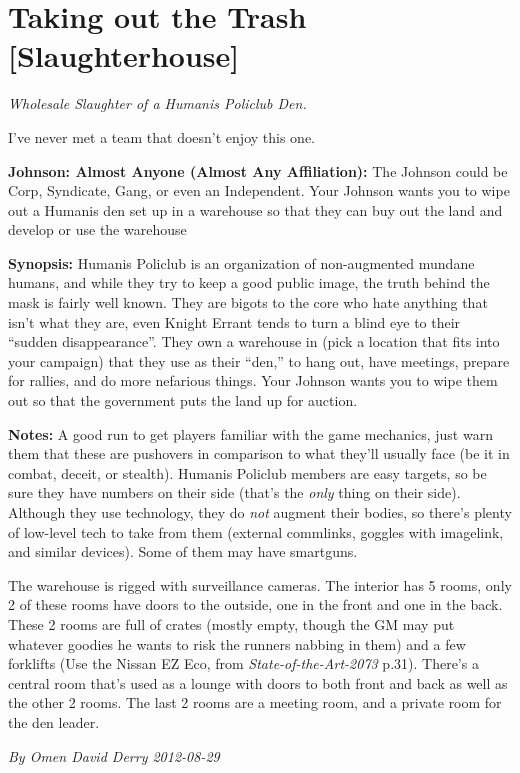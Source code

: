 \documentclass[letterpaper,twocolumn,10.5pt]{article}
\newenvironment{scenario}[6]
	{
		\section{#1 {\small[#2]}}
		\textit{#3}
		\def\TMPSCENARIO{#4 #5}
	}
	{\small\textit{By \TMPSCENARIO}}
\newcommand{\johnson}[2]{\textbf{Johnson: #1 (#2):}}
\newcommand{\synopsis}{\textbf{Synopsis: }}
\newcommand{\notes}{\textbf{Notes: }}
\begin{document}
\begin{scenario}{Taking out the Trash}
	{Slaughterhouse}
	{ Wholesale Slaughter of a Humanis Policlub Den.}
	{Omen David Derry}
	{2012-08-29}
	{https://forum.rpg.net/showthread.php?321504-Shadowrun-4th-101-Instant-Scenarios\&p=15839327#post15839327}

I've never met a team that doesn't enjoy this one.

\johnson{Almost Anyone}{Almost Any Affiliation} The Johnson could be Corp, Syndicate, Gang, or even an Independent. Your Johnson wants you to wipe out a Humanis den set up in a warehouse so that they can buy out the land and develop or use the warehouse

\synopsis Humanis Policlub is an organization of non-augmented mundane humans, and while they try to keep a good public image, the truth behind the mask is fairly well known. They are bigots to the core who hate anything that isn't what they are, even Knight Errant tends to turn a blind eye to their ``sudden disappearance''. They own a warehouse in (pick a location that fits into your campaign) that they use as their ``den,'' to hang out, have meetings, prepare for rallies, and do more nefarious things. Your Johnson wants you to wipe them out so that the government puts the land up for auction.

\notes A good run to get players familiar with the game mechanics, just warn them that these are pushovers in comparison to what they'll usually face (be it in combat, deceit, or stealth). Humanis Policlub members are easy targets, so be sure they have numbers on their side (that's the \textit{only} thing on their side). Although they use technology, they do \textit{not} augment their bodies, so there's plenty of low-level tech to take from them (external commlinks, goggles with imagelink, and similar devices). Some of them may have smartguns.

The warehouse is rigged with surveillance cameras. The interior has 5 rooms, only 2 of these rooms have doors to the outside, one in the front and one in the back. These 2 rooms are full of crates (mostly empty, though the GM may put whatever goodies he wants to risk the runners nabbing in them) and a few forklifts (Use the Nissan EZ Eco, from \textit{State-of-the-Art-2073} p.31). There's a central room that's used as a lounge with doors to both front and back as well as the other 2 rooms. The last 2 rooms are a meeting room, and a private room for the den leader.


\end{scenario}
\end{document}
